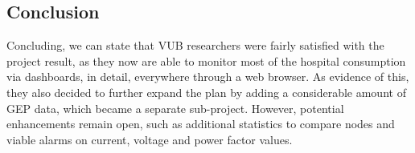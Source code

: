 \subsection{Conclusion}
Concluding, we can state that \ac{VUB} researchers were fairly satisfied with the project result, as they now are able to monitor most of the hospital consumption via dashboards, in detail, everywhere through a web browser.
As evidence of this, they also decided to further expand the plan by adding a considerable amount of \ac{GEP} data, which became a separate sub-project.
However, potential enhancements remain open, such as additional statistics to compare nodes and viable alarms on current, voltage and power factor values. 


